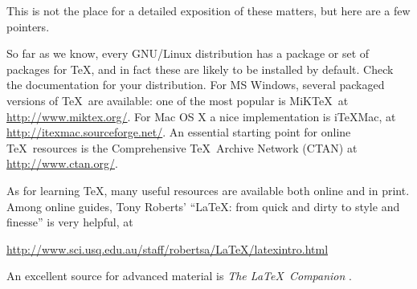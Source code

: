 This is not the place for a detailed exposition of these matters, but
here are a few pointers.  

So far as we know, every GNU/Linux distribution has a package or set
of packages for \TeX, and in fact these are likely to be installed by
default.  Check the documentation for your distribution.  For MS
Windows, several packaged versions of \TeX\ are available: one of the
most popular is MiK\TeX\, at \url{http://www.miktex.org/}.  For Mac OS
X a nice implementation is i\TeX{}Mac, at
\url{http://itexmac.sourceforge.net/}.  An essential starting point for
online \TeX\ resources is the Comprehensive
\TeX\ Archive Network (CTAN) at \url{http://www.ctan.org/}.

As for learning \TeX, many useful resources are available both online
and in print.  Among online guides, Tony Roberts' ``\LaTeX: from quick
and dirty to style and finesse'' is very helpful, at

\url{http://www.sci.usq.edu.au/staff/robertsa/LaTeX/latexintro.html}

An excellent source for advanced material is \emph{The \LaTeX\
  Companion} \citep{goossens04}.


